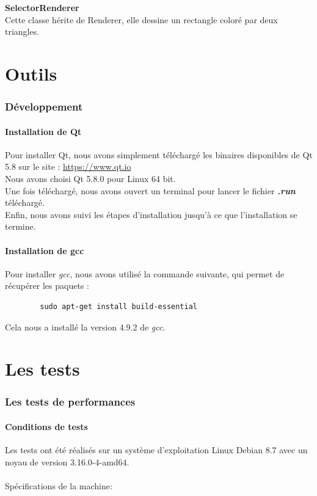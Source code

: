 \documentclass[12pt]{article}
\begin{document}
		\textbf{SelectorRenderer}\\
		Cette classe hérite de Renderer, elle dessine un rectangle coloré par deux triangles.
		
\newpage
\part{Outils}
	\section{Développement}
		\subsection{Installation de Qt}
		Pour installer Qt, nous avons simplement téléchargé les binaires disponibles de Qt 5.8
		sur le site :  \url{https://www.qt.io} \\
		
		Nous avons choisi Qt 5.8.0 pour Linux 64 bit.\\
		Une fois téléchargé, nous avons ouvert un terminal pour lancer le fichier \textit{\textbf{.run}} téléchargé.\\
		Enfin, nous avons suivi les étapes d'installation jusqu'à ce que l'installation se termine.
		
		\subsection{Installation de gcc}
		Pour installer \textit{gcc}, nous avons utilisé la commande suivante, qui permet de récupérer les paquets :
		\begin{verbatim}
		sudo apt-get install build-essential
		\end{verbatim}
		Cela nous a installé la version 4.9.2 de \textit{gcc}.
		

\newpage
\part{Les tests}
	\section{Les tests de performances} \label{tests_performances}
		\subsection{Conditions de tests}
		Les tests ont été réalisés sur un système d’exploitation Linux Debian 8.7 avec
		un noyau de version 3.16.0-4-amd64. \\ \\
		Spécifications de la machine: \\
		
\end{document}
